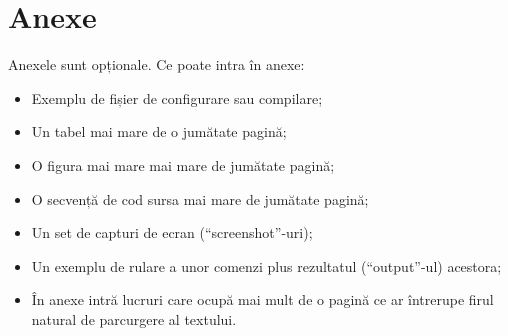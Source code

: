 \documentclass[12pt,a4paper]{report}
\begin{document}
\newpage

\chapter{Anexe}

Anexele sunt opționale.
Ce poate intra în anexe:
\begin{itemize}
\item	Exemplu de fișier de configurare sau compilare;
\item	Un tabel mai mare de o jumătate pagină;
\item	O figura mai mare mai mare de jumătate pagină;
\item	O secvență de cod sursa mai mare de jumătate pagină;
\item	Un set de capturi de ecran (``screenshot''-uri);
\item	Un exemplu de rulare a unor comenzi plus rezultatul (``output''-ul) acestora;
\item 	În anexe intră lucruri care ocupă mai mult de o pagină ce ar întrerupe firul natural de parcurgere al textului.
\end{itemize}
\end{document}
